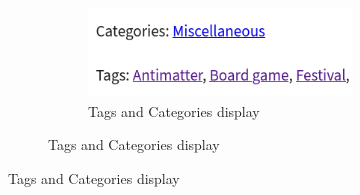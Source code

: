 \begin{figure}[th]
    \begin{subfigure}[c]{.5\textwidth}
        \centering
        \begin{subfigure}[t]{\textwidth}
            \centering
            \includegraphics[width=.7\textwidth]{Image/Process/tags_categories.png}
            \caption{Tags and Categories display}
            \label{fig:tags_categories}
        \end{subfigure}
        

\end{subfigure}
\end{figure}

